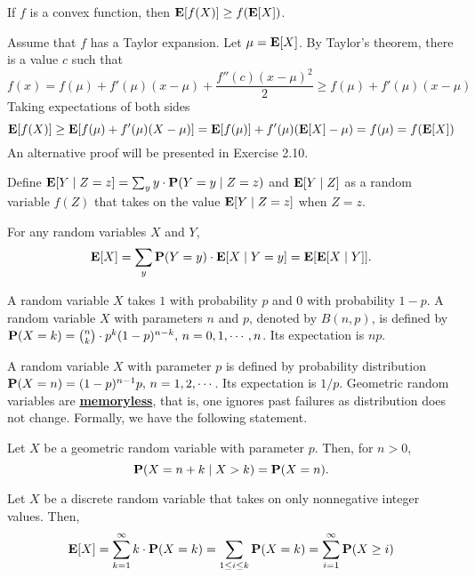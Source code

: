 \documentclass[main.tex]{subfiles}
\begin{document}
\begin{theorem}
	If $f$ is a convex function, then $\mathbf{E}[f(X)]\ge f(\mathbf{E}[X])$.
\end{theorem}

\begin{pf}
	Assume that $f$ has a Taylor expansion. Let $\mu=\mathbf{E}[X]$. By Taylor's theorem, there is a value $c$ such that
	\[
		f(x)=f(\mu)+f'(\mu)(x-\mu)+\frac{f''(c)(x-\mu)^2}{2}\ge f(\mu)+f'(\mu)(x-\mu)
	\]
	Taking expectations of both sides
	\[
		\mathbf{E}[f(X)]\ge\mathbf{E}[f(\mu)+f'(\mu)(X-\mu)]=\mathbf{E}[f(\mu)]+f'(\mu)(\mathbf{E}[X]-\mu)=f(\mu)=f(\mathbf{E}[X])
	\]
	An alternative proof will be presented in Exercise 2.10.
\end{pf}

Define  $\mathbf{E}[Y\mid Z=z]=\sum_{y}y\cdot\mathbf{P}(Y=y\mid Z=z)$ and $\mathbf{E}[Y\mid Z]$ as a random variable $f(Z)$ that takes on the value $\mathbf{E}[Y\mid Z=z]$ when $Z=z$.

\begin{theorem}
	For any random variables $X$ and $Y$, 
	\[
		\mathbf{E}[X]=\sum_y\mathbf{P}(Y=y)\cdot\mathbf{E}[X\mid Y=y]=\mathbf{E}[\mathbf{E}[X\mid Y]].
	\]
\end{theorem}

A  random variable $X$ takes $1$ with probability $p$ and $0$ with probability $1-p$. A  random variable $X$ with parameters $n$ and $p$, denoted by $B(n,p)$, is defined by  $\mathbf{P}(X=k)=\binom{n}{k}\cdot p^k(1-p)^{n-k},\,n=0,1,\cdots,n$. Its expectation is $np$.

A  random variable $X$ with parameter $p$ is defined by probability distribution $\mathbf{P}(X=n) = (1-p)^{n-1}p,\,n=1,2,\cdots$. Its expectation is $1/p$. Geometric random variables are \href{https://en.wikipedia.org/wiki/Memorylessness}{\bf memoryless}, that is, one ignores past failures as distribution does not change. Formally, we have the following statement.

\begin{lemma} Let $X$ be a geometric random variable with parameter $p$. Then, for $n>0$,
	\[
		\mathbf{P}(X=n+k \mid X > k) = \mathbf{P}(X=n).
	\]
\end{lemma}

\begin{lemma}
	Let $X$ be a discrete random variable that takes on only nonnegative integer values. Then, 
	\[\mathbf{E}[X]=\sum_{k=1}^{\infty}k\cdot \mathbf{P}(X=k) = \sum_{1\le i \le k} \mathbf{P}(X=k)=\sum_{i=1}^{\infty}\mathbf{P}(X \ge i)\]
\end{lemma}
\end{document}
